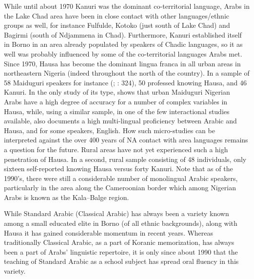 \documentclass[output=paper]{langsci/langscibook}
\begin{document}
While until about 1970 Kanuri was the dominant co-territorial language, Arabs in the Lake Chad area have been in close contact with other languages/ethnic groups as well, for instance Fulfulde, Kotoko (just south of Lake Chad) and Bagirmi (south of Ndjammena in Chad). Furthermore, Kanuri established itself in Borno in an area already populated by speakers of Chadic languages, so it as well was probably influenced by some of the co-territorial languages Arabs met. Since 1970, Hausa has become the dominant lingua franca in all urban areas in northeastern Nigeria (indeed throughout the north of the country). In a sample of 58 Maiduguri speakers for instance (\citealt{Owens1998}; \citealt{Owens2000article}: 324), 50 professed knowing Hausa, and 46 Kanuri. In the only study of its type, \citet{Broß2007} shows that urban Maiduguri Nigerian Arabs have a high degree of accuracy for a number of complex variables in Hausa, while, using a similar sample, in one of the few interactional studies available, \citet{Owens2002} also documents a high multi-lingual proficiency between Arabic and Hausa, and for some speakers, English. How such micro-studies can be interpreted against the over 400 years of NA contact with area languages remains a question for the future. Rural areas have not yet experienced such a high penetration of Hausa. In a second, rural sample consisting of 48 individuals, only sixteen self-reported knowing Hausa versus forty Kanuri. Note that as of the 1990’s, there were still a considerable number of monolingual Arabic speakers, particularly in the area along the Cameroonian border which among Nigerian Arabs is known as the Kala--Balge region.

While Standard Arabic (Classical Arabic) has always been a variety known among a small educated elite in Borno (of all ethnic backgrounds), along with Hausa it has gained considerable momentum in recent years. Whereas traditionally Classical Arabic, as a part of Koranic memorization, has always been a part of Arabs’ linguistic repertoire, it is only since about 1990 that the teaching of Standard Arabic as a school subject has spread oral fluency in this variety. 
\end{document}
